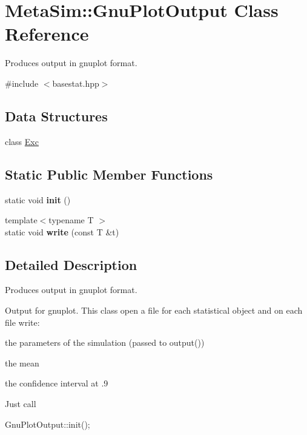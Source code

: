 \hypertarget{classMetaSim_1_1GnuPlotOutput}{}\section{Meta\+Sim\+:\+:Gnu\+Plot\+Output Class Reference}
\label{classMetaSim_1_1GnuPlotOutput}


Produces output in gnuplot format.  




{\ttfamily \#include $<$basestat.\+hpp$>$}

\subsection*{Data Structures}
\begin{DoxyCompactItemize}
\item 
class \hyperlink{classMetaSim_1_1GnuPlotOutput_1_1Exc}{Exc}
\end{DoxyCompactItemize}
\subsection*{Static Public Member Functions}
\begin{DoxyCompactItemize}
\item 
static void {\bfseries init} ()
\item 
{\footnotesize template$<$typename T $>$ }\\static void {\bfseries write} (const T \&t)
\end{DoxyCompactItemize}


\subsection{Detailed Description}
Produces output in gnuplot format. 

Output for gnuplot. This class open a file for each statistical object and on each file write\+:


\begin{DoxyItemize}
\item the parameters of the simulation (passed to output()) 
\item the mean 
\item the confidence interval at .9 
\end{DoxyItemize}

Just call


\begin{DoxyPre} GnuPlotOutput::init(); \end{DoxyPre}


